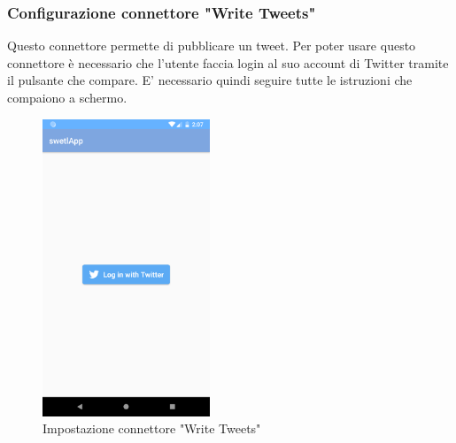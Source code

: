 \subsubsection{Configurazione connettore "Write Tweets"}
Questo connettore permette di pubblicare un tweet. Per poter usare questo connettore è necessario che l'utente faccia login al suo account di Twitter tramite il pulsante che compare.
E' necessario quindi seguire tutte le istruzioni che compaiono a schermo.
\begin{figure}[H]
	\centering
	\includegraphics[width=5cm]{../includes/pics/conf_twitter_write.png}
	\caption{\label{fig:conf_twitter_write}Impostazione connettore "Write Tweets"}
\end{figure}


